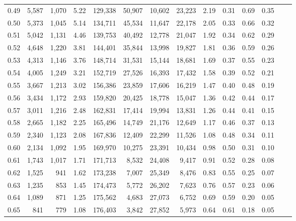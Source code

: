 \begin{tabular}{rrrrrrrrrrrrrr}
0.49 &  5,587 &  1,070 &    5.22 &  129,338 &   50,907 &  10,602 &  23,223 &  2.19 &  0.31 &  0.69 &      0.35 \\
0.50 &  5,373 &  1,045 &    5.14 &  134,711 &   45,534 &  11,647 &  22,178 &  2.05 &  0.33 &  0.66 &      0.32 \\
0.51 &  5,042 &  1,131 &    4.46 &  139,753 &   40,492 &  12,778 &  21,047 &  1.92 &  0.34 &  0.62 &      0.29 \\
0.52 &  4,648 &  1,220 &    3.81 &  144,401 &   35,844 &  13,998 &  19,827 &  1.81 &  0.36 &  0.59 &      0.26 \\
0.53 &  4,313 &  1,146 &    3.76 &  148,714 &   31,531 &  15,144 &  18,681 &  1.69 &  0.37 &  0.55 &      0.23 \\
0.54 &  4,005 &  1,249 &    3.21 &  152,719 &   27,526 &  16,393 &  17,432 &  1.58 &  0.39 &  0.52 &      0.21 \\
0.55 &  3,667 &  1,213 &    3.02 &  156,386 &   23,859 &  17,606 &  16,219 &  1.47 &  0.40 &  0.48 &      0.19 \\
0.56 &  3,434 &  1,172 &    2.93 &  159,820 &   20,425 &  18,778 &  15,047 &  1.36 &  0.42 &  0.44 &      0.17 \\
0.57 &  3,011 &  1,216 &    2.48 &  162,831 &   17,414 &  19,994 &  13,831 &  1.26 &  0.44 &  0.41 &      0.15 \\
0.58 &  2,665 &  1,182 &    2.25 &  165,496 &   14,749 &  21,176 &  12,649 &  1.17 &  0.46 &  0.37 &      0.13 \\
0.59 &  2,340 &  1,123 &    2.08 &  167,836 &   12,409 &  22,299 &  11,526 &  1.08 &  0.48 &  0.34 &      0.11 \\
0.60 &  2,134 &  1,092 &    1.95 &  169,970 &   10,275 &  23,391 &  10,434 &  0.98 &  0.50 &  0.31 &      0.10 \\
0.61 &  1,743 &  1,017 &    1.71 &  171,713 &    8,532 &  24,408 &   9,417 &  0.91 &  0.52 &  0.28 &      0.08 \\
0.62 &  1,525 &    941 &    1.62 &  173,238 &    7,007 &  25,349 &   8,476 &  0.83 &  0.55 &  0.25 &      0.07 \\
0.63 &  1,235 &    853 &    1.45 &  174,473 &    5,772 &  26,202 &   7,623 &  0.76 &  0.57 &  0.23 &      0.06 \\
0.64 &  1,089 &    871 &    1.25 &  175,562 &    4,683 &  27,073 &   6,752 &  0.69 &  0.59 &  0.20 &      0.05 \\
0.65 &    841 &    779 &    1.08 &  176,403 &    3,842 &  27,852 &   5,973 &  0.64 &  0.61 &  0.18 &      0.05 \\

\end{tabular}
